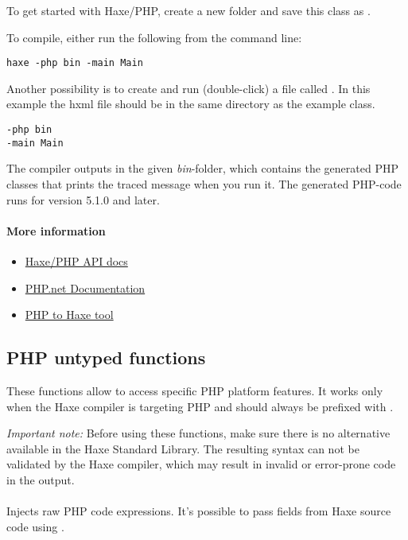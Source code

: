 To get started with Haxe/PHP, create a new folder and save this class as .


To compile, either run the following from the command line:

\begin{lstlisting}
haxe -php bin -main Main
\end{lstlisting}

Another possibility is to create and run (double-click) a file called . In this example the hxml file should be in the same directory as the example class.

\begin{lstlisting}
-php bin
-main Main
\end{lstlisting}

The compiler outputs in the given \emph{bin}-folder, which contains the generated PHP classes that prints the traced message when you run it. The generated PHP-code runs for version 5.1.0 and later.

\paragraph{More information}

\begin{itemize}
	\item \href{http://api.haxe.org/php/}{Haxe/PHP API docs}
	\item \href{http://php.net/docs.php}{PHP.net Documentation}
	\item \href{http://phptohaxe.haqteam.com/code.php}{PHP to Haxe tool}
\end{itemize}


\subsection{PHP untyped functions}
\label{target-php-untyped}

These functions allow to access specific PHP platform features. It works only when the Haxe compiler is targeting PHP and should always be prefixed with . 

\emph{Important note:} Before using these functions, make sure there is no alternative available in the Haxe Standard Library. The resulting syntax can not be validated by the Haxe compiler, which may result in invalid or error-prone code in the output.

\paragraph{}
Injects raw PHP code expressions. It's possible to pass fields from Haxe source code using .

